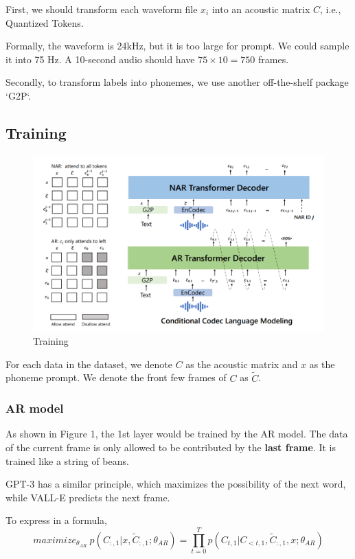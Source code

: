 \documentclass{article}
\begin{document}
First, we should transform each waveform file $x_i$ into an acoustic matrix $C$, i.e., Quantized Tokens. 

Formally, the waveform is 24kHz, but it is too large for prompt. We could sample it into 75 Hz. A 10-second audio should have $75\times 10=750$ frames. 

\vspace{5pt}
Secondly, to transform labels into phonemes, we use another off-the-shelf package `G2P`. 

\subsection{Training}

\begin{figure}[h]
    \centering
    \includegraphics[width=0.9\linewidth]{training.png}
    \caption{Training}
    
\end{figure}

For each data in the dataset, we denote $C$ as the acoustic matrix and $x$ as the phoneme prompt. We denote the front few frames of $C$ as $\tilde C$. 


\subsubsection{AR model}
As shown in Figure 1, the 1st layer would be trained by the AR model. The data of the current frame is only allowed to be contributed by the\textbf{ last frame}. It is trained like a string of beans. 


GPT-3 has a similar principle, which maximizes the possibility of the next word, while VALL-E predicts the next frame. 

\vspace{5pt}
To express in a formula, 
\vspace{-15pt}
\[
maximize_{\theta_{AR}}\ p(C_{:,1}|x, \tilde{C}_{:,1};\theta_{AR})=\prod_{t=0}^T p(C_{t,1}|C_{<t,1},\tilde{C}_{:,1}, x;\theta_{AR})
\]
\end{document}
